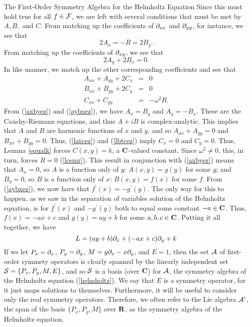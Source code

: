 \begin{section}{The First-Order Symmetry Algebra for the Helmholtz Equation}
Since this must hold true for all $f \in \mathcal{F}$, we are left with several conditions that must be met by $A, B,$ and $C$.  From matching up the coefficients of $\partial_{x x}$ and $\partial_{y y}$, for instance, we see that
\begin{equation}
\label{axbyez}
2 A_x = -R = 2 B_y.
\end{equation}
From matching up the coefficients of $\partial_{x y}$, we see that
\begin{equation}
\label{aybxez}
2 A_y + 2 B_x = 0.
\end{equation}
In like manner, we match up the other corresponding coefficients and see that
\begin{eqnarray}
\label{latcez}
A_{xx} + A_{yy} + 2 C_x	& = & 0 \\
\label{lbtcez}
B_{xx} + B_{yy} + 2 C_y	& = & 0 \\
\label{lcemr}
C_{xx} + C_{yy}		& = & -\omega^2 R.
\end{eqnarray}
From (\ref{axbyez}) and (\ref{aybxez}), we have $A_x = B_y$ and $A_y = -B_x$.  These are the Cauchy-Riemann equations, and thus $A + iB$ is complex-analytic. This implies that $A$ and $B$ are harmonic functions of $x$ and $y$, and so $A_{xx} + A_{yy} = 0$ and $B_{xx} + B_{yy} = 0$.  Thus, (\ref{latcez}) and (\ref{lbtcez}) imply $C_x = 0$ and $C_y = 0$.  Thus, Lemma \ref{equalk} forces $C(x,y) = k$, a $\mathbf{C}$-valued constant.  Since $\omega^2 \not= 0$, this, in turn, forces $R = 0$ (\ref{lcemr}).  This result in conjunction with (\ref{axbyez}) means that $A_x = 0$, so $A$ is a function only of $y$: $A(x,y) = g(y)$ for some $g$; and $B_y = 0$, so $B$ is a function only of $x$: $B(x,y) = f(x)$ for some $f$.  From (\ref{aybxez}), we now have that $f^\prime(x) = -g^\prime(y)$.  The only way for this to happen, as we saw in the separation of variables solution of the Helmholtz equation, is for $f^\prime(x)$ and $-g^\prime(y)$ both to equal some constant $-a \in \mathbf{C}$.  Thus, $f(x) = -a x + c$ and $g(y) = a y + b$ for some $a, b, c \in \mathbf{C}$.  Putting it all together, we have
\[
L = (a y + b) \partial_{x} + (-a x + c) \partial_{y} + k
\]
If we let $P_x = \partial_{x}$, $P_y = \partial_{y}$, $M = y \partial_{x} - x \partial_{y}$, and $E = 1$, then the set $\mathcal{A}$ of first-order symmety operators is clearly spanned by the linearly independent set $\mathcal{S} = \{P_x, P_y, M, E\}$, and so $\mathcal{S}$ is a basis (over $\mathbf{C}$) for $\mathcal{A}$, the symmetry algebra of the Helmholtz equation (\ref{helmholtz}).  We say that $E$ is a  symmetry operator, for it just maps solutions to themselves.  Furthermore, it will be useful to consider only the real symmetry operators.  Therefore, we often refer to the Lie algebra $\mathcal{A}^\prime$, the span of the basis $\{P_x, P_y, M \}$ over $\mathbf{R}$, as the symmetry algebra of the Helmholtz equation.


\end{section}
